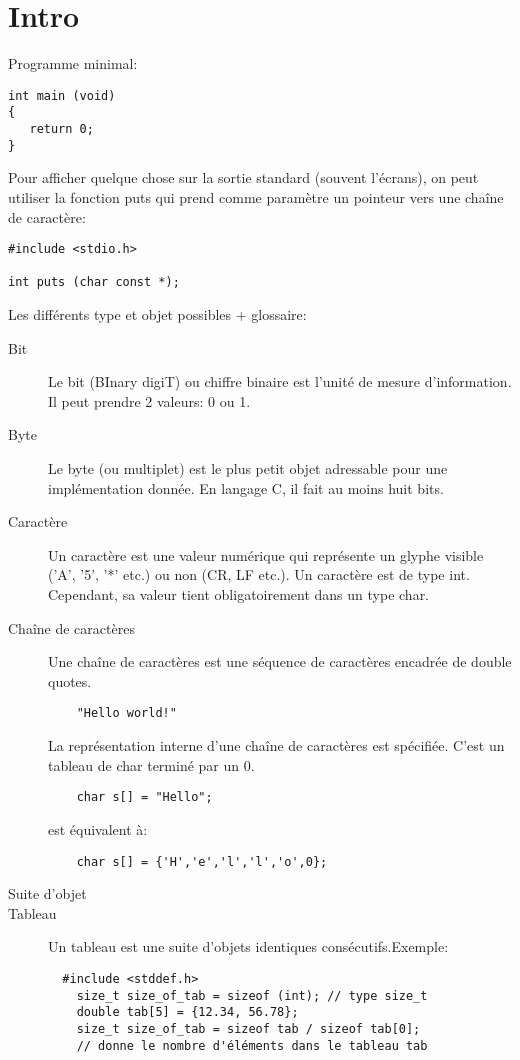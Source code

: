 \documentclass[a4paper]{article}
\begin{document}
\section{Intro}
Programme minimal:
\begin{lstlisting}
int main (void)
{
   return 0;
}   
\end{lstlisting}
Pour afficher quelque chose sur la sortie standard (souvent l'écrans), on peut utiliser la fonction puts qui prend comme paramètre un pointeur vers une chaîne de caractère:
\begin{lstlisting}
#include <stdio.h>

int puts (char const *);
\end{lstlisting}
Les différents type et objet possibles + glossaire:
\begin{description}
  \item [Bit] Le bit (BInary digiT) ou chiffre binaire est l'unité de mesure d'information. Il peut prendre 2 valeurs: 0 ou 1.
  \item [Byte] Le byte (ou multiplet) est le plus petit objet adressable pour une implémentation donnée. En langage C, il fait au moins huit bits.
  \item [Caractère] Un caractère est une valeur numérique qui représente un glyphe visible ('A', '5', '*' etc.) ou non (CR, LF etc.). Un caractère est de type int. Cependant, sa valeur tient obligatoirement dans un type char.
  \item [Chaîne de caractères] Une chaîne de caractères est une séquence de caractères encadrée de double quotes. \newline
  \begin{lstlisting}
    "Hello world!"
  \end{lstlisting}
  La représentation interne d'une chaîne de caractères est spécifiée. C'est un tableau de char terminé par un 0.
  \begin{lstlisting}
    char s[] = "Hello";
  \end{lstlisting}
  
  est équivalent à:
  \begin{lstlisting}
    char s[] = {'H','e','l','l','o',0};
  \end{lstlisting}
  \item [\guillemotleft{}Suite d'objet\guillemotright{}]
  \item [Tableau] Un tableau est une suite d'objets identiques consécutifs.\newline Exemple:
  \begin{lstlisting}
  #include <stddef.h>
    size_t size_of_tab = sizeof (int); // type size_t
    double tab[5] = {12.34, 56.78};
    size_t size_of_tab = sizeof tab / sizeof tab[0];
    // donne le nombre d'éléments dans le tableau tab
  \end{lstlisting}


\end{description}
\end{document}
